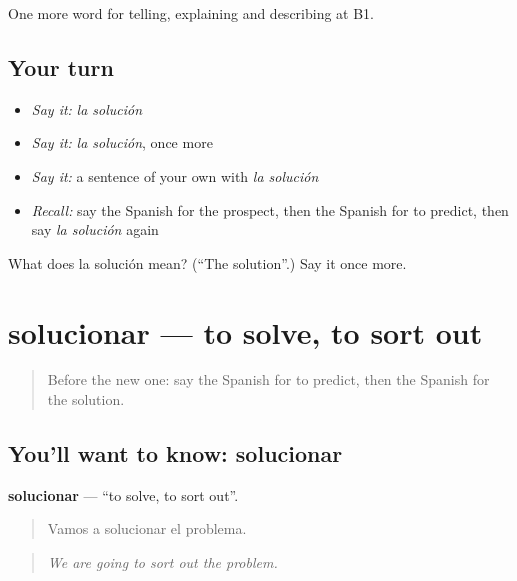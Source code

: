 \begin{grammarlens}[title={What you've built}]
One more word for telling, explaining and describing at B1.
\end{grammarlens}

\subsection*{Your turn}
\begin{itemize}
\raggedright
  \item \emph{Say it:} \emph{la solución}
  \item \emph{Say it:} \emph{la solución}, once more
  \item \emph{Say it:} a sentence of your own with \emph{la solución}
  \item \emph{Recall:} say the Spanish for the prospect, then the Spanish for to predict, then say \emph{la solución} again
\end{itemize}

\begin{tcolorbox}[breakable,colback=teal!4,colframe=teal!35!black,title={Before you move on}]
What does la solución mean? (\textquotedblleft{}The solution\textquotedblright{}.) Say it once more.
\end{tcolorbox}
\section[solucionar]{solucionar — to solve, to sort out}

\label{lesson:ES-C620-solucionar}



\begin{quote}
Before the new one: say the Spanish for to predict, then the Spanish for the solution.
\end{quote}

\subsection*{You'll want to know: solucionar}
\textbf{solucionar} — \textquotedblleft{}to solve, to sort out\textquotedblright{}.

\begin{quote}
Vamos a solucionar el problema.
\end{quote}

\begin{quote}
\emph{We are going to sort out the problem.}
\end{quote}


